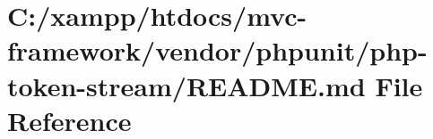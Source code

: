 \hypertarget{vendor_2phpunit_2php-token-stream_2_r_e_a_d_m_e_8md}{}\section{C\+:/xampp/htdocs/mvc-\/framework/vendor/phpunit/php-\/token-\/stream/\+R\+E\+A\+D\+ME.md File Reference}
\label{vendor_2phpunit_2php-token-stream_2_r_e_a_d_m_e_8md}

